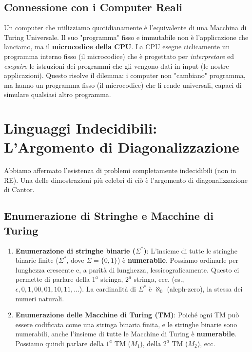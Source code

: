 \documentclass[a4paper]{article}
\begin{document}
\subsection{Connessione con i Computer Reali}

Un computer che utilizziamo quotidianamente è l'equivalente di una Macchina di Turing Universale. Il suo "programma" fisso e immutabile non è l'applicazione che lanciamo, ma il \textbf{microcodice della CPU}. La CPU esegue ciclicamente un programma interno fisso (il microcodice) che è progettato per \textit{interpretare} ed \textit{eseguire} le istruzioni dei programmi che gli vengono dati in input (le nostre applicazioni). Questo risolve il dilemma: i computer non "cambiano" programma, ma hanno un programma fisso (il microcodice) che li rende universali, capaci di simulare qualsiasi altro programma.

\section{Linguaggi Indecidibili: L'Argomento di Diagonalizzazione}

Abbiamo affermato l'esistenza di problemi completamente indecidibili (non in RE). Una delle dimostrazioni più celebri di ciò è l'argomento di diagonalizzazione di Cantor.

\subsection{Enumerazione di Stringhe e Macchine di Turing}

\begin{enumerate}
    \item \textbf{Enumerazione di stringhe binarie ($\Sigma^*$)}: L'insieme di tutte le stringhe binarie finite ($\Sigma^*$, dove $\Sigma = \{0,1\}$) è \textbf{numerabile}. Possiamo ordinarle per lunghezza crescente e, a parità di lunghezza, lessicograficamente. Questo ci permette di parlare della $1^{a}$ stringa, $2^{a}$ stringa, ecc. (es., $\epsilon, 0, 1, 00, 01, 10, 11, \dots$). La cardinalità di $\Sigma^*$ è $\aleph_0$ (aleph-zero), la stessa dei numeri naturali.
    \item \textbf{Enumerazione delle Macchine di Turing (TM)}: Poiché ogni TM può essere codificata come una stringa binaria finita, e le stringhe binarie sono numerabili, anche l'insieme di tutte le Macchine di Turing è \textbf{numerabile}. Possiamo quindi parlare della $1^{a}$ TM ($M_1$), della $2^{a}$ TM ($M_2$), ecc.
\end{enumerate}
\end{document}
